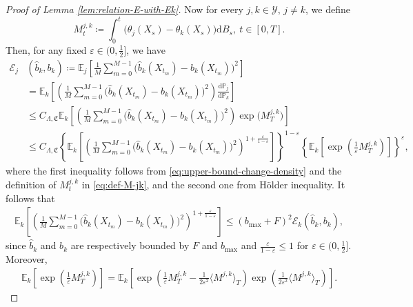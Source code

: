\documentclass{article}
\theoremstyle{plain}
\theoremstyle{definition}
\theoremstyle{remark}
\renewcommand{\d}{\mathrm{d}}
\newcommand{\PP}{\mathbb{P}}
\newcommand{\EE}{\mathbb{E}}
\newcommand{\calY}{\mathcal{Y}}
\begin{document}
\begin{proof}[Proof of Lemma \ref{lem:relation-E-with-Ek}]
Now for every $j,k\in\calY, \,j\neq k$, we define
\begin{equation}\label{eq:def-M-jk}
 M_{t}^{j,k}\coloneqq \int_{0}^{t}\big(\theta_j(X_s)-\theta_k(X_s)\big)\d B_s, \:t\in[0,T].    
\end{equation}
Then, for any fixed $\varepsilon\in(0,\frac{1}{2}]$, we have 
\begin{align}\label{eq:change-measure-j-to-k}
\mathcal{E}_j&(\widehat b_k,b_k)
\coloneqq
\EE_j \left[
\frac{1}{M}\sum_{m=0}^{M-1}
\Big(\widehat b_k(X_{t_m})-b_k(X_{t_m})\Big)^2
\right]\nonumber\\
&= \EE_k \left[
\left(\frac{1}{M}\sum_{m=0}^{M-1}
\Big(\widehat b_k(X_{t_m})-b_k(X_{t_m})\Big)^2 \right)\frac{\d \PP_j}{\d \PP_k}
\right]\nonumber\\
&\leq C_{\Lambda, \mathfrak{C}}\EE_k \left[
\left(\frac{1}{M}\sum_{m=0}^{M-1}
\Big(\widehat b_k(X_{t_m})-b_k(X_{t_m})\Big)^2 \right)\exp\big(M_T^{j,k}\big)
\right]\nonumber\\
&\leq C_{\Lambda, \mathfrak{C}} \left\{\EE_k \left[
\left(\frac{1}{M}\sum_{m=0}^{M-1}
\Big(\widehat b_k(X_{t_m})-b_k(X_{t_m})\Big)^2 \right)^{1+\frac{\varepsilon}{1-\varepsilon}}\right]\right\}^{1-\varepsilon} \left\{ \EE_k \left[\exp\left(\frac{1}{\varepsilon}M_T^{j,k}\right)\right] \right\}^{\varepsilon},
\end{align}
where the first inequality follows from \eqref{eq:upper-bound-change-density} and the definition of $M_t^{j,k}$ in \eqref{eq:def-M-jk}, and the second one from H\"older inequality. 
It follows that 
\begin{align}
    \EE_k \left[
\left(\frac{1}{M}\sum_{m=0}^{M-1}
\Big(\widehat b_k(X_{t_m})-b_k(X_{t_m})\Big)^2 \right)^{1+\frac{\varepsilon}{1-\varepsilon}}\right]\leq (b_{\max}+F)^2\mathcal{E}_k(\widehat b_k,b_k),
\end{align}
since $\widehat b_k$ and $b_k$ are respectively bounded by $F$ and $b_{\max}$ and $\frac{\varepsilon}{1-\varepsilon}\leq 1$ for $\varepsilon\in(0,\frac{1}{2}]$. Moreover, 
\begin{align}
    \EE_k \left[\exp\left(\frac{1}{\varepsilon}M_T^{j,k}\right)\right] =\EE_k \left[\exp\left(\frac{1}{\varepsilon}M_T^{j,k}-\frac{1}{2\varepsilon^2}\langle M^{j,k}\rangle_T\right)\exp\left(\frac{1}{2\varepsilon^2}\langle M^{j,k}\rangle_T\right)\right]. 
\end{align}

\end{proof}
\end{document}
